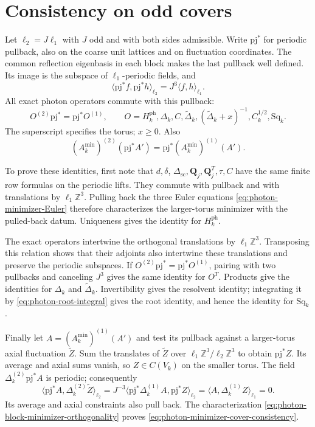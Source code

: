 \documentclass[11pt,letterpaper,reqno]{amsart}
\newcommand{\Z}{\mathbb Z}
\begin{document}
\section{Consistency on odd covers}
\label{subsec:photon-cover-consistency}

Let $\ell_2=J\ell_1$ with $J$ odd and with both sides admissible.
Write $\mathrm{pj}^*$ for periodic pullback, also on the coarse
unit lattices and on fluctuation coordinates. The common
reflection eigenbasis in each block makes the last pullback
well defined. Its image is the subspace of $\ell_1$-periodic
fields, and
\[
 \langle\mathrm{pj}^*f,\mathrm{pj}^*h\rangle_{\ell_2}
                              =J^3\langle f,h\rangle_{\ell_1}.
\]
All exact photon operators commute with this pullback:
\begin{equation}\label{eq:photon-exact-cover-consistency}
 O^{(2)}\mathrm{pj}^*=\mathrm{pj}^*O^{(1)},
 \qquad
 O=H_k^{\mathrm{ph}},\Delta_k,C,\widetilde\Delta_k,
                (\widetilde\Delta_k+x)^{-1},C_k^{1/2},\mathrm{Sq}_k.
\end{equation}
The superscript specifies the torus; $x\ge0$. Also
\begin{equation}\label{eq:photon-minimizer-cover-consistency}
 (A_k^{\min})^{(2)}(\mathrm{pj}^*A')
                         =\mathrm{pj}^*(A_k^{\min})^{(1)}(A').
\end{equation}

To prove these identities, first note that $d,\delta$,
$\Delta_{\mathrm{sc}},\mathbf Q_j,\mathbf Q_j^T,\tau,C$
have the same finite row formulas on the periodic lifts. They
commute with pullback and with translations by $\ell_1\Z^3$.
Pulling back the three Euler equations
\eqref{eq:photon-minimizer-Euler} therefore characterizes the
larger-torus minimizer with the pulled-back datum. Uniqueness
gives the identity for $H_k^{\mathrm{ph}}$.

The exact operators intertwine the orthogonal translations by
$\ell_1\Z^3$. Transposing this relation shows that their adjoints
also intertwine these translations and preserve the periodic subspaces. If
$O^{(2)}\mathrm{pj}^*=\mathrm{pj}^*O^{(1)}$, pairing with two
pullbacks and canceling $J^3$ gives the same identity for $O^T$.
Products give the identities for $\Delta_k$ and
$\widetilde\Delta_k$. Invertibility gives the resolvent identity;
integrating it by \eqref{eq:photon-root-integral} gives the root
identity, and hence the identity for $\mathrm{Sq}_k$.

Finally let $A=(A_k^{\min})^{(1)}(A')$ and test its pullback
against a larger-torus axial fluctuation $\widetilde Z$. Sum the
translates of $\widetilde Z$ over
$\ell_1\Z^3/\ell_2\Z^3$ to obtain $\mathrm{pj}^*Z$. Its average
and axial sums vanish, so $Z\in C(V_k)$ on the smaller torus.
The field $\Delta_k^{(2)}\mathrm{pj}^*A$ is periodic; consequently
\[
 \langle\mathrm{pj}^*A,\Delta_k^{(2)}\widetilde Z\rangle_{\ell_2}
  =J^{-3}\langle\mathrm{pj}^*\Delta_k^{(1)}A,
                                         \mathrm{pj}^*Z\rangle_{\ell_2}
  =\langle A,\Delta_k^{(1)}Z\rangle_{\ell_1}=0.
\]
Its average and axial constraints also pull back. The
characterization \eqref{eq:photon-block-minimizer-orthogonality}
proves \eqref{eq:photon-minimizer-cover-consistency}.
\end{document}
